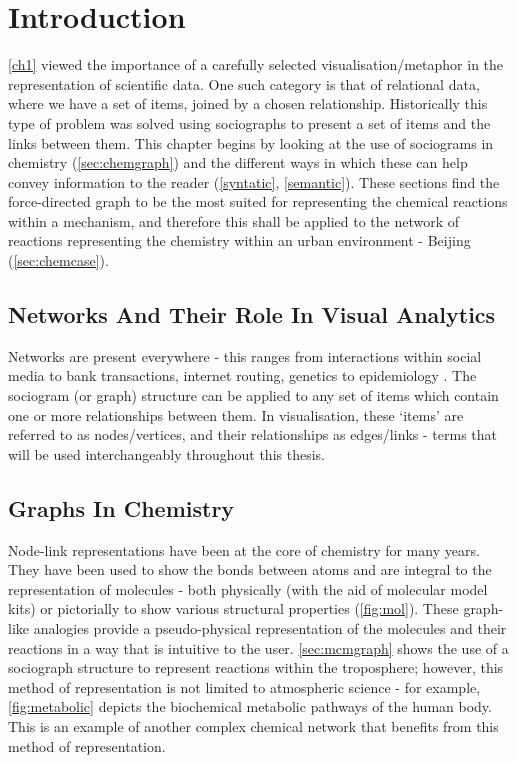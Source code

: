 
\section{Introduction}
\autoref{ch1} viewed the importance of a carefully selected visualisation/metaphor in the representation of scientific data. One such category is that of relational data, where we have a set of items, joined by a chosen relationship. Historically
this type of problem was solved using sociographs to present a set of items and the links between them. This chapter begins by looking at the use of sociograms in chemistry (\autoref{sec:chemgraph}) and the different ways in which these can help convey information to the reader (\autoref{syntatic}, \autoref{semantic}). These sections find the force-directed graph to be the most suited for representing the chemical reactions within a mechanism, and therefore this shall be applied to the network of reactions representing the chemistry within an urban environment - Beijing (\autoref{sec:chemcase}).


\subsection{Networks And Their Role In Visual Analytics} \label{sec:va}
Networks are present everywhere - this ranges from interactions within social media to bank transactions, internet routing, genetics to epidemiology \citep{worldmap, epidim,neoj4,netneuro,prbank,ch4,ch8,ch9}. The sociogram (or graph) structure can be applied to any set of items which contain one or more relationships between them. In visualisation, these `items' are referred to as nodes/vertices, and their relationships as edges/links \citep{ch1} - terms that will be used interchangeably throughout this thesis.


\subsection{Graphs In Chemistry}\label{sec:chemgraph}
Node-link representations have been at the core of chemistry for many years. They have been used to show the bonds between atoms and are integral to the representation of molecules - both physically (with the aid of molecular model kits) or pictorially to show various structural properties (\autoref{fig:mol}). These graph-like analogies provide a pseudo-physical representation of the molecules and their reactions in a way that is intuitive to the user. \autoref{sec:mcmgraph} shows the use of a sociograph structure to represent reactions within the troposphere; however, this method of representation is not limited to atmospheric science - for example, \autoref{fig:metabolic} depicts the biochemical metabolic pathways of the human body. This is an example of another complex chemical network that benefits from this method of representation.


